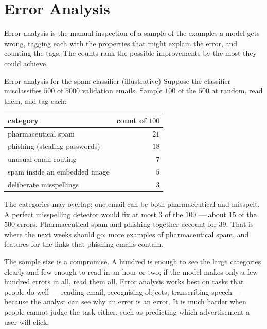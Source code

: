 \section{Error Analysis}
\label{sec:error-analysis}

\begin{defbox}{Error analysis}
 is the manual inspection of a sample of the examples a
model gets wrong, tagging each with the properties that might explain the error,
and counting the tags. The counts rank the possible improvements by the most
they could achieve.
\end{defbox}

\begin{workedexample}{Error analysis for the spam classifier (illustrative)}
Suppose the classifier misclassifies $500$ of $5000$ validation emails. Sample
$100$ of the $500$ at random, read them, and tag each:

\begin{center}
\small
\renewcommand{\arraystretch}{1.15}
\begin{tabular}{@{}lr@{}}
\toprule
category & count of $100$\\
\midrule
pharmaceutical spam              & $21$\\
phishing (stealing passwords)    & $18$\\
unusual email routing            & $7$\\
spam inside an embedded image    & $5$\\
deliberate misspellings          & $3$\\
\bottomrule
\end{tabular}
\end{center}

The categories may overlap; one email can be both pharmaceutical and misspelt.
A perfect misspelling detector would fix at most $3$ of the $100$ --- about $15$
of the $500$ errors. Pharmaceutical spam and phishing together account for $39$.
That is where the next weeks should go: more examples of pharmaceutical spam,
and features for the links that phishing emails contain.
\end{workedexample}

The sample size is a compromise. A hundred is enough to see the large categories
clearly and few enough to read in an hour or two; if the model makes only a few
hundred errors in all, read them all. Error analysis works best on tasks that
people do well --- reading email, recognising objects, transcribing speech ---
because the analyst can see why an error is an error. It is much harder when
people cannot judge the task either, such as predicting which advertisement a
user will click.

